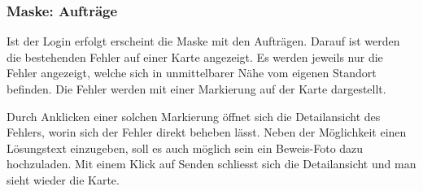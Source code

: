 \begin{figure}[H]
\hfill
{}
\end{figure}

\subsubsection{Maske: Aufträge}
Ist der Login erfolgt erscheint die Maske mit den Aufträgen.
Darauf ist werden die bestehenden Fehler auf einer Karte angezeigt.
Es werden jeweils nur die Fehler angezeigt, welche sich in unmittelbarer Nähe vom eigenen Standort befinden.
Die Fehler werden mit einer Markierung auf der Karte dargestellt.

Durch Anklicken einer solchen Markierung öffnet sich die Detailansicht des Fehlers, worin sich der Fehler direkt beheben lässt.
Neben der Möglichkeit einen Lösungstext einzugeben, soll es auch möglich sein ein Beweis-Foto dazu hochzuladen.
Mit einem Klick auf Senden schliesst sich die Detailansicht und man sieht wieder die Karte.

